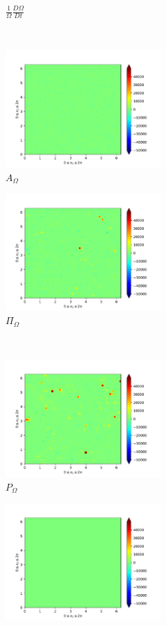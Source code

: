 \begin{figure}[H]
\begin{subfigure}[H]{0.45\textwidth}
        \caption{$\frac{1}{\Omega} \frac{D \Omega}{Dt}$}
    \end{subfigure}
    ~
    \begin{subfigure}{0.45\textwidth}
        \includegraphics[height=1.75in]{media/run-cds-65-25k/A-enst-449.png}
        \caption{$A_{\Omega}$}
    \end{subfigure}
    \newline
    \begin{subfigure}{0.45\textwidth}
        \includegraphics[height=1.75in]{media/run-cds-65-25k/Pi-enst-449.png}
        \caption{$\Pi_{\Omega}$}
    \end{subfigure}
    ~
    \begin{subfigure}{0.45\textwidth}
        \includegraphics[height=1.75in]{media/run-cds-65-25k/P-enst-449.png}
        \caption{$P_{\Omega}$}
    \end{subfigure}
    \newline
    \begin{subfigure}{0.45\textwidth}
        \includegraphics[height=1.75in]{media/run-cds-65-25k/B-enst-449.png}

\end{subfigure}
\end{figure}
